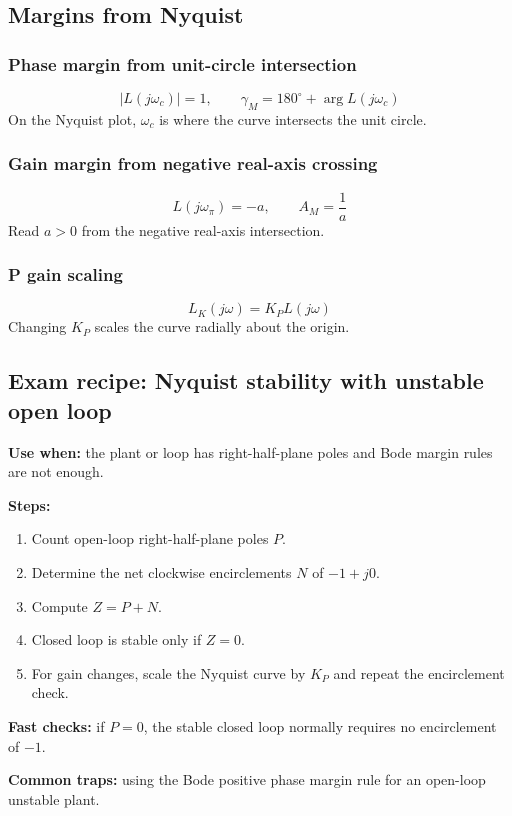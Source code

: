 \subsection{Margins from Nyquist}

\subsubsection{Phase margin from unit-circle intersection}
\[
|L(j\omega_c)|=1,\qquad \gamma_M=180^\circ+\arg L(j\omega_c)
\]
On the Nyquist plot, \(\omega_c\) is where the curve intersects the unit circle.

\subsubsection{Gain margin from negative real-axis crossing}
\[
L(j\omega_\pi)=-a,\qquad A_M=\frac{1}{a}
\]
Read \(a>0\) from the negative real-axis intersection.

\subsubsection{P gain scaling}
\[
L_K(j\omega)=K_PL(j\omega)
\]
Changing \(K_P\) scales the curve radially about the origin.

\subsection{Exam recipe: Nyquist stability with unstable open loop}

\textbf{Use when:} the plant or loop has right-half-plane poles and Bode margin rules are not enough.

\textbf{Steps:}
\begin{enumerate}
\item Count open-loop right-half-plane poles \(P\).
\item Determine the net clockwise encirclements \(N\) of \(-1+j0\).
\item Compute \(Z=P+N\).
\item Closed loop is stable only if \(Z=0\).
\item For gain changes, scale the Nyquist curve by \(K_P\) and repeat the encirclement check.
\end{enumerate}

\textbf{Fast checks:} if \(P=0\), the stable closed loop normally requires no encirclement of \(-1\).

\textbf{Common traps:} using the Bode positive phase margin rule for an open-loop unstable plant.

